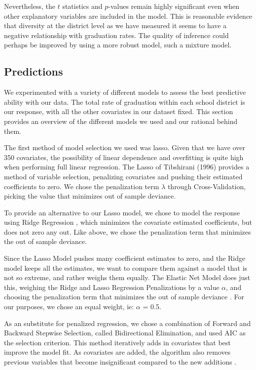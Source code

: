 \documentclass{article}
\begin{document}
Nevertheless, the $t$ statistics and $p$-values remain highly significant even when other explanatory variables are included in the model.  This is reasonable evidence that diversity at the district level as we have measured it seems to have a negative relationship with graduation rates.  The quality of inference could perhaps be improved by using a more robust model, such a mixture model.

\subsection{Predictions}

We experimented with a variety of different models to assess the best predictive ability with our data. The total rate of graduation within each school district is our response, with all the other covariates in our dataset fixed. This section provides an overview of the different models we used and our rational behind them.

The first method of model selection we used was lasso.  Given that we have over 350 covariates, the possibility of linear dependence and overfitting is quite high when performing full linear regression. The Lasso of Tibshirani (1996)\cite{lasso} provides a method of variable selection, penalizing covariates and pushing their estimated coefficients to zero. We chose the penalization term $\lambda$ through Cross-Validation, picking the value that minimizes out of sample deviance.

To provide an alternative to our Lasso model, we chose to model the response using Ridge Regression \cite{ridge}, which minimizes the covariate estimated coefficients, but does not zero any out. Like above, we chose the penalization term that minimizes the out of sample deviance.

Since the Lasso Model pushes many coefficient estimates to zero, and the Ridge model keeps all the estimates, we want to compare them against a model that is not so extreme, and rather weighs them equally. The Elastic Net Model does just this, weighing the Ridge and Lasso Regression Penalizations by a value $\alpha$, and choosing the penalization term that minimizes the out of sample deviance \cite{elasticnet}. For our purposes, we chose an equal weight, ie: $\alpha$ = 0.5.

As an substitute for penalized regression, we chose a combination of Forward and Backward Stepwise Selection, called Bidirectional Elimination\cite{step}, and used AIC\cite{aic} as the selection criterion. This method iteratively adds in covariates that best improve the model fit. As covariates are added, the algorithm also removes previous variables that become insignificant compared to the new additions \cite{wiki}.
\end{document}
